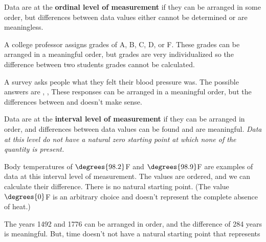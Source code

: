 \documentclass{beamer}
\begin{document}
\begin{frame}
\begin{definition}
Data are at the \textbf{ordinal level of measurement} if they can be arranged in some order, but differences between data values either cannot be determined or are meaningless.
\end{definition}\pause

\begin{example}
A college professor assigns grades of A, B, C, D, or F. These grades can be arranged in a meaningful order, but grades are very individualized so the difference between two students grades cannot be calculated.
\end{example}\pause

\begin{example}
A survey asks people what they felt their blood pressure was. The possible answers are , ,  These responses can be arranged in a meaningful order, but the differences between  and  doesn't make sense.
\end{example}
\end{frame}

\begin{frame}
\begin{definition}
Data are at the \textbf{interval level of measurement} if they can be arranged in order, and differences between data values can be found and are meaningful. \emph{Data at this level do not have a natural zero starting point at which none of the quantity is present.}
\end{definition}\pause

\begin{example}
Body temperatures of $\degrees{98.2}$F and $\degrees{98.9}$F are examples of data at this interval level of measurement. The values are ordered, and we can calculate their difference. There is no natural starting point. (The value $\degrees{0}$F is an arbitrary choice and doesn't represent the complete absence of heat.)
\end{example}\pause

\begin{example}
The years 1492 and 1776 can be arranged in order, and the difference of 284 years is meaningful. But, time doesn't not have a natural starting point that represents 
\end{example}
\end{frame}
\end{document}
